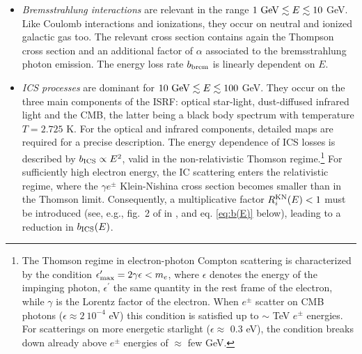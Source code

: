 \begin{itemize}
\begin{itemize}
 
\item {\em Bremsstrahlung interactions} are relevant in the range $1 \ {\rm GeV} \lesssim E \lesssim 10$ GeV.  Like Coulomb interactions and ionizations, they occur on neutral and ionized galactic gas too. The relevant cross section contains again the Thompson cross section and an additional factor of $\alpha$ associated to the bremsstrahlung photon emission. The energy loss rate $b_{\rm brem}$ is linearly dependent on $E$. 


\item {\em ICS processes} are dominant for $10 \ {\rm GeV} \lesssim E \lesssim 100$ GeV. They occur on the three main components of the ISRF: 
optical star-light, dust-diffused infrared light and the CMB, the latter being a black body spectrum with temperature $T=2.725$ K. 
For the optical and infrared components, detailed maps are required for a precise description.
The energy dependence of ICS losses is described by $b_{\rm ICS} \propto E^2$, valid in the non-relativistic Thomson regime.\footnote{The Thomson regime in electron-photon Compton scattering is characterized by the condition  $\epsilon^\prime_{\rm max} = 2 \gamma \epsilon < m_e$, where $\epsilon$ denotes the energy of the impinging photon, $\epsilon^\prime$ the same quantity in the rest frame of the electron, while $\gamma$ is the Lorentz factor of the electron. 
When $e^\pm$ scatter on CMB photons ($\epsilon \approx 2\ 10^{-4}$ eV) this condition is satisfied up to $\sim$ TeV $e^\pm$ energies. For scatterings on more energetic starlight ($\epsilon \approx$ 0.3 eV), the condition breaks down already above $e^\pm$ energies of $\approx$ few GeV.} 
For sufficiently high electron energy, the IC scattering enters the relativistic regime, where the $\gamma e^\pm$ Klein-Nishina cross section becomes smaller than in the Thomson limit.
Consequently, a multiplicative factor $R_i^{\rm KN}(E) < 1$ must be introduced (see, e.g., fig.~2 of  in \cite{CRenergylosses}, and eq. \eqref{eq:b(E)} below), leading to a reduction in $b_{\rm ICS}(E)$.




\end{itemize}
\end{itemize}
